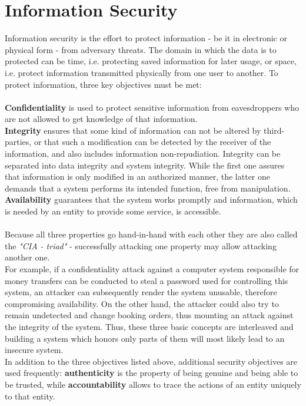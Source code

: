\label{chap2}
\section{Information Security}

Information security is the effort to protect information - be it in electronic or physical form - from adversary threats. 
The domain in which the data is to protected can be time, i.e. protecting saved information for later usage, or space, i.e. protect information
transmitted physically from one user to another. To protect information, three key objectives must be met:
\\
\\
\textbf{Confidentiality} is used to protect sensitive information from eavesdroppers who are not allowed to get knowledge of that information.
\\
\textbf{Integrity} ensures that some kind of information can not be altered by third-parties, or that such a modification can be detected by the
receiver of the information, and also includes information non-repudiation. Integrity can be separated into data integrity and system integrity. While the first one assures
that information is only modified in an authorized manner, the latter one demands that a system performs its intended function, free from manipulation.
\\
\textbf{Availability} guarantees that the system works promptly and information, which is needed by an entity to provide some service, is accessible.
\\
\\
Because all three properties go hand-in-hand with each other they are also called the \textit{"CIA - triad"} \cite{stallings} - successfully attacking one property may allow attacking
another one. 
\\
For example, if a
confidentiality attack against a computer system responsible for money transfers can be conducted to steal a password used for controlling this system,
an attacker
can subsequently render the system unusable, therefore compromising availability. On the other hand, the attacker could also try to remain undetected and change
booking orders, thus mounting an attack against the integrity of the system. Thus, these three basic concepts are interleaved and building a system which honors
only parts of them will most likely lead to an insecure system.
\\
In addition to the three objectives listed above, additional security objectives are used frequently: \textbf{authenticity} is the property of being genuine and being able to be 
trusted, while \textbf{accountability} allows to trace the actions of an entity uniquely to that entity.
